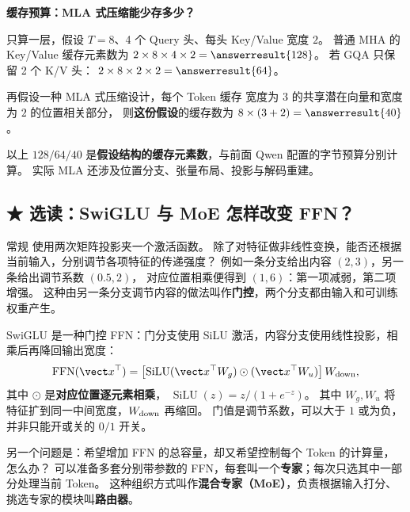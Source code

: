 \noindent\textbf{缓存预算：MLA 式压缩能少存多少？}\par

只算一层，假设 $T=8$、4 个 Query 头、每头 Key/Value 宽度 $2$。
普通 MHA 的 Key/Value 缓存元素数为
$2\times8\times4\times2=\answerresult{128}$。
若 GQA 只保留 2 个 K/V 头：
$2\times8\times2\times2=\answerresult{64}$。

再假设一种 MLA 式压缩设计，每个 Token 缓存
宽度为 $3$ 的共享潜在向量和宽度为 $2$ 的位置相关部分，
则\textbf{这份假设}的缓存数为
$8\times(3+2)=\answerresult{40}$。


\begin{boundarybox}
以上 $128/64/40$ 是\textbf{假设结构的缓存元素数}，与前面 Qwen 配置的字节预算分别计算。
实际 MLA 还涉及位置分支、张量布局、投影与解码重建。
\end{boundarybox}

\subsection{\texorpdfstring{{\symboliconfont ★}}{★} 选读：SwiGLU 与 MoE 怎样改变 FFN？}
\label{elective:architecture-extras}
\label{concept:router}
\label{concept:swiglu}
\label{concept:moe}

常规  使用两次矩阵投影夹一个激活函数。
除了对特征做非线性变换，能否还根据当前输入，分别调节各项特征的传递强度？
例如一条分支给出内容 $(2,3)$，另一条给出调节系数 $(0.5,2)$，
对应位置相乘便得到 $(1,6)$：第一项减弱，第二项增强。
这种由另一条分支调节内容的做法叫作\textbf{门控}，两个分支都由输入和可训练权重产生。

SwiGLU 是一种门控 FFN：门分支使用 SiLU 激活，内容分支使用线性投影，相乘后再降回输出宽度：
\begin{equation}
\operatorname{FFN}(\vect x^\top)
=\left[
\operatorname{SiLU}(\vect x^\top W_g)
\odot(\vect x^\top W_u)\right]W_{\rm down},
\label{eq:swiglu-illustration}
\end{equation}
其中 $\odot$ 是\textbf{对应位置逐元素相乘}，
$\operatorname{SiLU}(z)=z/(1+e^{-z})$。
其中 $W_g,W_u$ 将特征扩到同一中间宽度，$W_{\rm down}$ 再缩回。
门值是调节系数，可以大于 $1$ 或为负，并非只能开或关的 $0/1$ 开关。

另一个问题是：希望增加 FFN 的总容量，却又希望控制每个 Token 的计算量，怎么办？
可以准备多套分别带参数的 FFN，每套叫一个\textbf{专家}；每次只选其中一部分处理当前 Token。
这种组织方式叫作\textbf{混合专家（MoE）}，负责根据输入打分、挑选专家的模块叫\textbf{路由器}。

